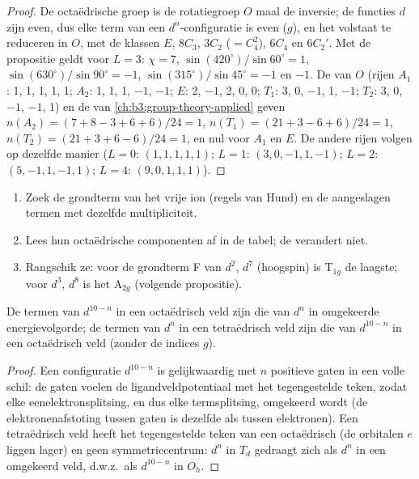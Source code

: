 \begin{proof}
De octaëdrische groep is de rotatiegroep $O$ maal de inversie; de functies $d$
zijn even, dus elke term van een $d^n$-configuratie is even ($g$), en het volstaat te
reduceren in $O$, met de klassen $E$, $8C_3$, $3C_2$ ($=C_4^2$), $6C_4$ en $6C_2'$. Met de
propositie geldt voor $L = 3$: $\chi = 7$, $\sin(420^\circ)/\sin60^\circ = 1$, $\sin(630^\circ)/\sin90^\circ = -1$, $\sin(315^\circ)/\sin45^\circ = -1$
en $-1$. De  van $O$ (rijen $A_1$: 1, 1, 1, 1, 1; $A_2$: 1, 1, 1, $-1$, $-1$; $E$: 2,
$-1$, 2, 0, 0; $T_1$: 3, 0, $-1$, 1, $-1$; $T_2$: 3, 0, $-1$, $-1$, 1) en de  van
\cref{ch:b3:group-theory-applied} geven $n(A_2) = (7 + 8 - 3 + 6 + 6)/24 = 1$, $n(T_1) = (21 + 3 - 6 +
6)/24 = 1$, $n(T_2) = (21 + 3 + 6 - 6)/24 = 1$, en nul voor $A_1$ en $E$. De andere rijen
volgen op dezelfde manier ($L = 0$: $(1, 1, 1, 1, 1)$; $L = 1$: $(3, 0, -1, 1, -1)$; $L = 2$: $(5, -1, 1,
-1, 1)$; $L = 4$: $(9, 0, 1, 1, 1)$).
\end{proof}

\begin{method}\label{met:b3:complex-spectra-magnetism:split-term}
\begin{enumerate}
  \item Zoek de grondterm van het vrije ion (regels van Hund) en de
        aangeslagen termen met dezelfde multipliciteit.
  \item Lees hun octaëdrische componenten af in de tabel; de
         verandert niet.
  \item Rangschik ze: voor de grondterm F van $d^2$, $d^7$ (hoogspin) is T$_{1g}$ de laagste;
        voor $d^3$, $d^8$ is het A$_{2g}$ (volgende propositie).
\end{enumerate}
\end{method}

\begin{proposition}\label{prop:b3:complex-spectra-magnetism:hole}
De termen van $d^{10-n}$ in een octaëdrisch veld zijn die van $d^n$ in omgekeerde
energievolgorde; de termen van $d^n$ in een tetraëdrisch veld zijn die van $d^{10-n}$ in een octaëdrisch
veld (zonder de indices $g$).
\end{proposition}

\begin{proof}
Een configuratie $d^{10-n}$ is gelijkwaardig met $n$ positieve gaten in een volle schil: de
gaten voelen de ligandveldpotentiaal met het tegengestelde teken, zodat
elke eenelektronsplitsing, en dus elke termsplitsing, omgekeerd wordt (de
elektronenafstoting tussen gaten is dezelfde als tussen elektronen). Een
tetraëdrisch veld heeft het tegengestelde teken van een octaëdrisch (de orbitalen $e$
liggen lager) en geen symmetriecentrum: $d^n$ in $T_d$ gedraagt zich als $d^n$ in een omgekeerd
veld, d.w.z.\ als $d^{10-n}$ in $O_h$.
\end{proof}


